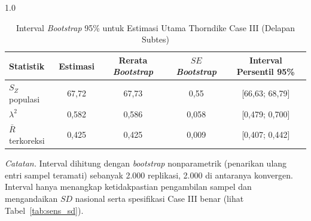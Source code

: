 \begin{table}[H]
    \centering
    \caption{Interval \textit{Bootstrap} 95\% untuk Estimasi Utama Thorndike Case III (Delapan Subtes)}
    \label{tab:bootstrap}
    \begin{spacing}{1.0}
    \begin{tabular}{lcccc}
        \toprule
        Statistik & Estimasi & Rerata \textit{Bootstrap} & $SE$ \textit{Bootstrap} & Interval Persentil 95\% \\
        \midrule
        $S_Z$ populasi & 67,72 & 67,73 & 0,55 & [66,63; 68,79] \\
        $\lambda^2$ & 0,582 & 0,586 & 0,058 & [0,479; 0,700] \\
        $\bar{R}$ terkoreksi & 0,425 & 0,425 & 0,009 & [0,407; 0,442] \\
        \bottomrule
    \end{tabular}
    \end{spacing}
    \vspace{2mm}
    \begin{flushleft}
    \footnotesize\textit{Catatan.} Interval dihitung dengan \textit{bootstrap} nonparametrik (penarikan ulang entri sampel teramati) sebanyak 2.000 replikasi, 2.000 di antaranya konvergen. Interval hanya menangkap ketidakpastian pengambilan sampel dan mengandaikan $SD$ nasional serta spesifikasi Case III benar (lihat Tabel~\ref{tab:sens_sd}).
    \end{flushleft}
\end{table}
